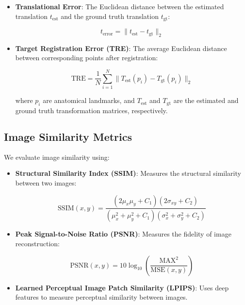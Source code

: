 \begin{appendices}
\begin{itemize}
    \item \textbf{Translational Error}: The Euclidean distance between the estimated translation $t_{\text{est}}$ and the ground truth translation $t_{\text{gt}}$:
    
    \begin{equation}
        t_{\text{error}} = \|t_{\text{est}} - t_{\text{gt}}\|_2
    \end{equation}
    
    \item \textbf{Target Registration Error (TRE)}: The average Euclidean distance between corresponding points after registration:
    
    \begin{equation}
        \text{TRE} = \frac{1}{N} \sum_{i=1}^{N} \|T_{\text{est}}(p_i) - T_{\text{gt}}(p_i)\|_2
    \end{equation}
    
    where $p_i$ are anatomical landmarks, and $T_{\text{est}}$ and $T_{\text{gt}}$ are the estimated and ground truth transformation matrices, respectively.
\end{itemize}

\subsection{Image Similarity Metrics}

We evaluate image similarity using:

\begin{itemize}
    \item \textbf{Structural Similarity Index (SSIM)}: Measures the structural similarity between two images:
    
    \begin{equation}
        \text{SSIM}(x, y) = \frac{(2\mu_x\mu_y + C_1)(2\sigma_{xy} + C_2)}{(\mu_x^2 + \mu_y^2 + C_1)(\sigma_x^2 + \sigma_y^2 + C_2)}
    \end{equation}
    
    \item \textbf{Peak Signal-to-Noise Ratio (PSNR)}: Measures the fidelity of image reconstruction:
    
    \begin{equation}
        \text{PSNR}(x, y) = 10 \log_{10}\left(\frac{\text{MAX}^2}{\text{MSE}(x, y)}\right)
    \end{equation}
    
    \item \textbf{Learned Perceptual Image Patch Similarity (LPIPS)}: Uses deep features to measure perceptual similarity between images.
    

\end{itemize}
\end{appendices}
